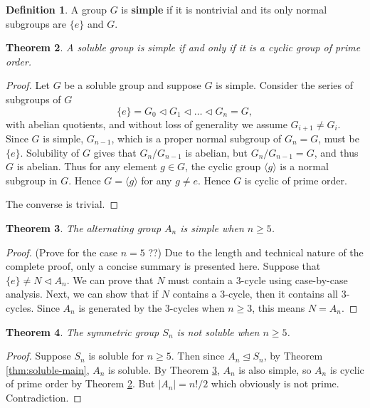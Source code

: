 \documentclass[12pt]{article}
\newtheorem{theorem}{Theorem}
\theoremstyle{definition}
\newtheorem{definition}[theorem]{Definition}
\begin{document}
\begin{definition}
    A group $G$ is \textbf{simple} if it is nontrivial and its only normal subgroups are $\{ e \}$ and $G$. 
\end{definition}

\begin{theorem} \label{thm:soluble-and-simple}
    A soluble group is simple if and only if it is a cyclic group of prime order.
\end{theorem}

\begin{proof}
    Let $G$ be a soluble group and suppose $G$ is simple. Consider the series of subgroups of $G$
$$
\{ e \}=G_0 \triangleleft G_1 \triangleleft \ldots \triangleleft G_n=G,
$$
with abelian quotients, and without loss of generality we assume $G_{i+1} \neq G_i$. Since $G$ is simple, $G_{n-1}$, which is a proper normal subgroup of $G_n = G$, must be $\{ e \}$. Solubility of $G$ gives that $G_n / G_{n -1 }$ is abelian, but $G_n / G_{n - 1} = G$, and thus $G$ is abelian. Thus for any element $g \in G$, the cyclic group $\langle g\rangle$ is a normal subgroup in $G$. Hence  $G = \langle g\rangle$ for any $g \neq e$. Hence $G$ is cyclic of prime order.

The converse is trivial.
\end{proof}


\begin{theorem} \label{thm:simple-alternating}
    The alternating group $A_n$ is simple when $n \ge 5$. 
\end{theorem}

\begin{proof}
    (Prove for the case $n=5$ ??) Due to the length and technical nature of the complete proof, only a concise summary is presented here. 
    Suppose that $\{ e \} \neq N \triangleleft A_n$. We can prove that $N$ must contain a $3$-cycle using case-by-case analysis. Next, we can show that if $N$ contains a $3$-cycle, then it contains all $3$-cycles. Since $A_n$ is generated by the $3$-cycles when $n \ge 3$, this means $N = A_n$.
\end{proof}

\begin{theorem} \label{thm:symmetric-not-soluble}
    The symmetric group $S_n$ is not soluble when $n \ge 5$. 
\end{theorem}

\begin{proof}
    Suppose $S_n$ is soluble for $n \ge 5$. Then since $A_n \trianglelefteq S_n$, by Theorem \ref{thm:soluble-main}, $A_n$ is soluble. By Theorem \ref{thm:simple-alternating}, $A_n$ is also simple, so $A_n$ is cyclic of prime order by Theorem \ref{thm:soluble-and-simple}. But $|A_n| = n! / 2$ which obviously is not prime. Contradiction.
\end{proof}
\end{document}
